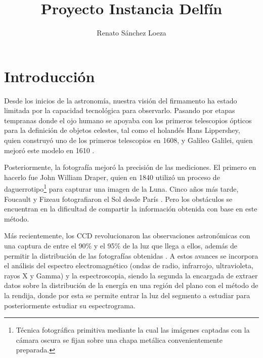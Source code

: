 \documentclass[9pt,twocolumn,a4paper]{opticajnl}
\title{Proyecto Instancia Delfín}
\author{Renato Sánchez Loeza}
\begin{document}
\maketitle
\section*{Introducción}
Desde los inicios de la astronomía, nuestra visión del firmamento ha estado limitada por la capacidad tecnológica para observarlo. Pasando por etapas tempranas donde el ojo humano se apoyaba con los primeros telescopios ópticos para la definición de objetos celestes, tal como el holandés Hans Lippershey, quien construyó uno de los primeros telescopios en 1608, y Galileo Galilei, quien mejoró este modelo en 1610 \cite{cana-2015}.

Posteriormente, la fotografía mejoró la precisión de las mediciones. El primero en hacerlo fue John William Draper, quien en 1840 utilizó un proceso de daguerrotipo\footnote{Técnica fotográfica primitiva mediante la cual las imágenes captadas con la cámara oscura se fijan sobre una chapa metálica convenientemente preparada.} para capturar una imagen de la Luna. Cinco años más tarde, Foucault y Fizeau fotografiaron el Sol desde París \cite{olsen2021birth}. Pero los obstáculos se encuentran en la dificultad de compartir la información obtenida con base en este método.

Más recientemente, los CCD revolucionaron las observaciones astronómicas con una captura de entre el 90\% y el 95\% de la luz que llega a ellos, además de permitir la distribución de las fotografías obtenidas \cite{las-cumbres}. A estos avances se incorpora el análisis del espectro electromagnético (ondas de radio, infrarrojo, ultravioleta, rayos X y Gamma) y la espectroscopia, siendo la segunda la encargada de extraer datos sobre la distribución de la energía en una región del plano con el método de la rendija, donde por esta se permite entrar la luz del segmento a estudiar para posteriormente estudiar su espectrograma.
\end{document}
